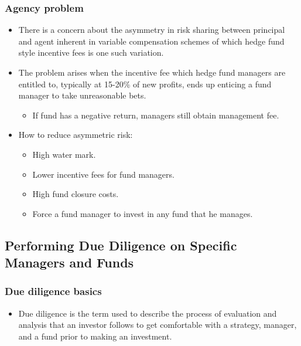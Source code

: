 \subsubsection{Agency problem}
\begin{itemize}
\item There is a concern about the asymmetry in risk sharing between principal and agent inherent in variable compensation schemes of which hedge fund style incentive fees is one such variation.
\item The problem arises when the incentive fee which hedge fund managers are entitled to, typically at 15-20\% of new profits, ends up enticing a fund manager to take unreasonable bets.
    \begin{itemize}
    \item If fund has a negative return, managers still obtain management fee.
    \end{itemize}
\item How to reduce asymmetric risk:
    \begin{itemize}
    \item High water mark.
    \item Lower incentive fees for fund managers.
    \item High fund closure costs.
    \item Force a fund manager to invest in any fund that he manages.
    \end{itemize}
\end{itemize}



\subsection{Performing Due Diligence on Specific Managers and Funds}



\subsubsection{Due diligence basics}
\begin{itemize}
\item Due diligence is the term used to describe the process of evaluation and analysis that an investor follows to get comfortable with a strategy, manager, and a fund prior to making an investment.
\end{itemize}



